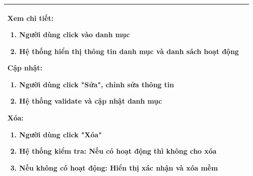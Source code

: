 \begin{table}[H]
\begin{tabular}{|m{}|m{}|}
    \textbf{Xem chi tiết:}
    \begin{enumerate}
        \item Người dùng click vào danh mục
        \item Hệ thống hiển thị thông tin danh mục và danh sách hoạt động
    \end{enumerate}

    \textbf{Cập nhật:}
    \begin{enumerate}
        \item Người dùng click "Sửa", chỉnh sửa thông tin
        \item Hệ thống validate và cập nhật danh mục
    \end{enumerate}

    \textbf{Xóa:}
    \begin{enumerate}
        \item Người dùng click "Xóa"
        \item Hệ thống kiểm tra: Nếu có hoạt động thì không cho xóa
        \item Nếu không có hoạt động: Hiển thị xác nhận và xóa mềm
    \end{enumerate}
    \\ \hline
    \end{tabular}
    \end{table}

